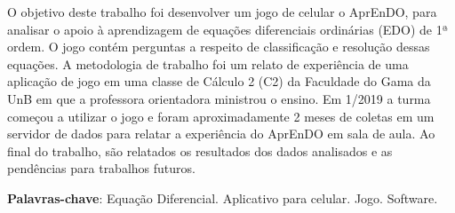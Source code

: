 \begin{resumo}
O objetivo deste trabalho foi desenvolver um jogo de celular o AprEnDO, para analisar o
 apoio à aprendizagem de equações diferenciais ordinárias (EDO) de 1ª ordem.
 O jogo contém perguntas a respeito de classificação e resolução dessas equações. A metodologia
 de trabalho foi um relato de experiência de uma aplicação de jogo em uma classe de Cálculo 2 (C2) da Faculdade do Gama da UnB em que a professora orientadora ministrou o ensino. Em 1/2019 a turma começou a utilizar o jogo e foram aproximadamente 2 meses de coletas em um servidor de dados para relatar a experiência do AprEnDO em sala de aula. Ao final do trabalho, são relatados os resultados dos dados analisados e as pendências para trabalhos futuros.
	
\begin{comment}
 Com a qualidade de ensino de matemática baixa e contra os métodos muito
 tradicionais de ensino nas salas de aula, resolveu-se desenvolver um 
 aplicativo para celular (iOS e Android) que seja um jogo para o suporte de 
 ensino de equações diferenciais (ED). Será realizada uma pesquisa descritiva
 para o levantamento bibliográfico das características que deverão estar presentes
 no software para dar auxílio a alunos com TDAH junto de técnicas de gamificação 
 para tentar deixar o aprendizado mais prazeroso.
\end{comment}
  
 \begin{comment}
 O resumo deve ressaltar o objetivo, o método, os resultados e as conclusões 
 do documento. A ordem e a extensão
 destes itens dependem do tipo de resumo (informativo ou indicativo) e do
 tratamento que cada item recebe no documento original. O resumo deve ser
 precedido da referência do documento, com exceção do resumo inserido no
 próprio documento. (\ldots) As palavras-chave devem figurar logo abaixo do
 resumo, antecedidas da expressão Palavras-chave:, separadas entre si por
 ponto e finalizadas também por ponto. O texto pode conter no mínimo 150 e 
 no máximo 500 palavras, é aconselhável que sejam utilizadas 200 palavras. 
 E não se separa o texto do resumo em parágrafos.
 \end{comment}

 \vspace{\onelineskip}
    
 \noindent
 \textbf{Palavras-chave}: Equação Diferencial. Aplicativo para celular. Jogo. Software.
\end{resumo}
